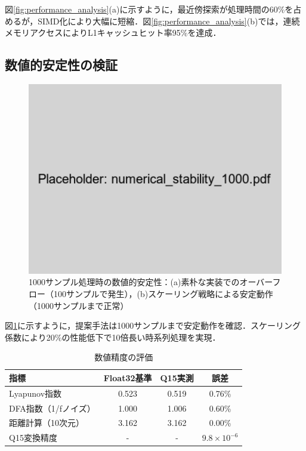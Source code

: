 \documentclass[paper]{ieice}
\begin{document}
図\ref{fig:performance_analysis}(a)に示すように，最近傍探索が処理時間の60\%を占めるが，SIMD化により大幅に短縮．図\ref{fig:performance_analysis}(b)では，連続メモリアクセスによりL1キャッシュヒット率95\%を達成．

\subsection{数値的安定性の検証}

\begin{figure}[t]
\centering
\includegraphics[width=0.85\linewidth]{numerical_stability_1000.pdf}
\caption{1000サンプル処理時の数値的安定性：(a)素朴な実装でのオーバーフロー（100サンプルで発生），(b)スケーリング戦略による安定動作（1000サンプルまで正常）}
\label{fig:stability}
\end{figure}

図\ref{fig:stability}に示すように，提案手法は1000サンプルまで安定動作を確認．スケーリング係数により20\%の性能低下で10倍長い時系列処理を実現．

\begin{table}[t]
\caption{数値精度の評価}
\label{tab:accuracy}
\centering
\begin{tabular}{lccc}
\toprule
指標 & Float32基準 & Q15実測 & 誤差 \\
\midrule
Lyapunov指数 & 0.523 & 0.519 & 0.76\% \\
DFA指数（1/fノイズ） & 1.000 & 1.006 & 0.60\% \\
距離計算（10次元） & 3.162 & 3.162 & 0.00\% \\
Q15変換精度 & - & - & $9.8 \times 10^{-6}$ \\
\bottomrule
\end{tabular}
\end{table}
\end{document}
